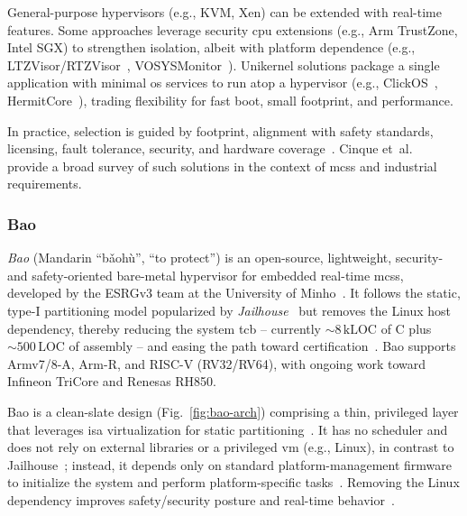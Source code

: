 General-purpose hypervisors (e.g., KVM, Xen) can be extended with real-time
features. Some approaches leverage security \gls{cpu} extensions (e.g., Arm
TrustZone, Intel SGX) to strengthen isolation, albeit with platform dependence
(e.g., LTZVisor/RTZVisor~\cite{pinto2016towards,rtzvisor}, VOSYSMonitor~\cite{lucas2017vosysmonitor,lucas_vosysmonitor_2018}).
Unikernel solutions package a single application with minimal \gls{os} services
to run atop a hypervisor (e.g., ClickOS~\cite{martins2014clickos},
HermitCore~\cite{lankes2016hermitcore}), trading flexibility for fast boot, small footprint, and performance.

In practice, selection is guided by footprint, alignment with safety standards,
licensing, fault tolerance, security,
and hardware coverage~\cite{cinque2022virtualizing}. Cinque
et~al.~\cite{cinque2022virtualizing} provide a broad survey of such solutions in the context of \glspl{mcs}
and industrial requirements.

\subsubsection{Bao}%
\label{sec:bao}
\emph{Bao} (Mandarin ``bǎohù'', ``to protect'') is an open-source, lightweight,
security- and safety-oriented bare-metal hypervisor for embedded real-time
\glspl{mcs}, developed by the ESRGv3 team at the University of
Minho~\cite{martins_et_al:OASIcs:2020:11779,baoRepo}. It follows the static,
type-I partitioning model popularized by \emph{Jailhouse}~\cite{jailhouse} but
removes the Linux host dependency, thereby reducing the system
\gls{tcb} -- currently \(\sim 8\,\text{kLOC}\) of C plus \(\sim 500\,\text{LOC}\) of
assembly -- and easing the path toward
certification~\cite{martins_et_al:OASIcs:2020:11779}. Bao supports Armv7/8-A,
Arm-R, and RISC-V (RV32/RV64), with ongoing work toward Infineon TriCore and
Renesas RH850.

Bao is a clean-slate design (Fig.~\ref{fig:bao-arch}) comprising a thin,
privileged layer that leverages \gls{isa} virtualization for static
partitioning~\cite{martins_et_al:OASIcs:2020:11779}. It has no scheduler and
does not rely on external libraries or a privileged \gls{vm} (e.g., Linux),
in contrast to Jailhouse~\cite{jailhouse}; instead, it depends only on standard
platform-management firmware to initialize the system and perform
platform-specific tasks~\cite{martins_et_al:OASIcs:2020:11779}. Removing the
Linux dependency improves safety/security posture and real-time
behavior~\cite{martins_et_al:OASIcs:2020:11779}.

